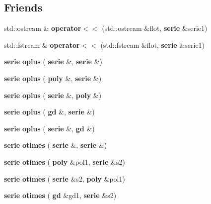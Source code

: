 \subsection*{Friends}
\begin{DoxyCompactItemize}
\item 
\mbox{\label{classmmgd_1_1mmgd_1_1serie_ab5c16b5ec4f47cf21bc40d7a8ed334ba}} 
std\+::ostream \& {\bfseries operator$<$$<$} (std\+::ostream \&flot, \textbf{ serie} \&serie1)
\item 
\mbox{\label{classmmgd_1_1mmgd_1_1serie_aa30553ecd514ac08baab9da517a1634b}} 
std\+::fstream \& {\bfseries operator$<$$<$} (std\+::fstream \&flot, \textbf{ serie} \&serie1)
\item 
\mbox{\label{classmmgd_1_1mmgd_1_1serie_a5cdfc5f944baf6a0d58154edf0289bd7}} 
\textbf{ serie} {\bfseries oplus} (\textbf{ serie} \&, \textbf{ serie} \&)
\item 
\mbox{\label{classmmgd_1_1mmgd_1_1serie_a8cefe99b16b97b3b2259c1a7a41bdec2}} 
\textbf{ serie} {\bfseries oplus} (\textbf{ poly} \&, \textbf{ serie} \&)
\item 
\mbox{\label{classmmgd_1_1mmgd_1_1serie_a785a2830a23c8b9df7fbd48a063d3233}} 
\textbf{ serie} {\bfseries oplus} (\textbf{ serie} \&, \textbf{ poly} \&)
\item 
\mbox{\label{classmmgd_1_1mmgd_1_1serie_a1e07a6e300fb9cbe0d6852e497b3cf2f}} 
\textbf{ serie} {\bfseries oplus} (\textbf{ gd} \&, \textbf{ serie} \&)
\item 
\mbox{\label{classmmgd_1_1mmgd_1_1serie_ae3797d1df8139dea71783da93a19db37}} 
\textbf{ serie} {\bfseries oplus} (\textbf{ serie} \&, \textbf{ gd} \&)
\item 
\mbox{\label{classmmgd_1_1mmgd_1_1serie_aea7881b4435b831b601498506d6f0b81}} 
\textbf{ serie} {\bfseries otimes} (\textbf{ serie} \&, \textbf{ serie} \&)
\item 
\mbox{\label{classmmgd_1_1mmgd_1_1serie_ac420e254d3fbdecfa4c845352efceae0}} 
\textbf{ serie} {\bfseries otimes} (\textbf{ poly} \&pol1, \textbf{ serie} \&s2)
\item 
\mbox{\label{classmmgd_1_1mmgd_1_1serie_a2ce30e8ff131fe98008b9e8846518a64}} 
\textbf{ serie} {\bfseries otimes} (\textbf{ serie} \&s2, \textbf{ poly} \&pol1)
\item 
\mbox{\label{classmmgd_1_1mmgd_1_1serie_a64dd80055a1485aa4188d3e51b65f327}} 
\textbf{ serie} {\bfseries otimes} (\textbf{ gd} \&gd1, \textbf{ serie} \&s2)
\item 
\mbox{\label{classmmgd_1_1mmgd_1_1serie_adae673cecde6bd03cc153ca190902664}} 

\end{DoxyCompactItemize}
